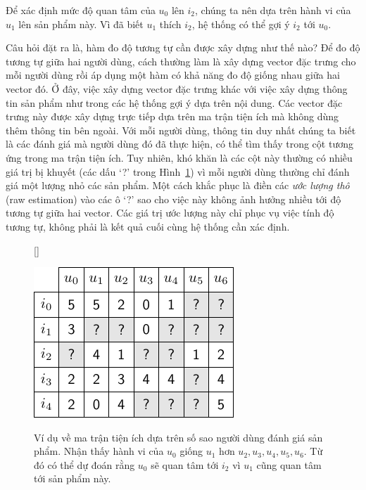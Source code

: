 Để xác định {mức độ quan tâm} của $u_0$ lên $i_2$, chúng
ta nên dựa trên {hành vi} của $u_1$ lên sản phẩm này. Vì đã biết $u_1$ {thích} $i_2$, hệ thống có thể gợi ý $i_2$ tới $u_0$.
 
Câu hỏi đặt ra là, hàm đo độ tương tự cần được xây dựng như thế nào? Để đo độ
tương tự giữa hai người dùng, cách thường làm là xây dựng vector đặc trưng cho
mỗi người dùng rồi áp dụng một hàm có khả năng đo độ giống nhau giữa hai vector
đó. Ở đây, việc xây dựng vector đặc trưng khác với việc xây dựng thông tin sản
phẩm như trong các hệ thống gợi ý dựa trên nội dung. Các vector đặc trưng này
được xây dựng trực tiếp dựa trên ma trận tiện ích mà không dùng thêm thông tin
bên ngoài. Với mỗi người dùng, thông tin duy nhất chúng ta biết là các đánh giá
mà người dùng đó đã thực hiện, có thể tìm thấy trong cột tương ứng trong ma trận
tiện ích. Tuy nhiên, khó khăn là các cột này thường có nhiều giá trị bị khuyết
(các dấu `?' trong Hình~\ref{fig:24_1}) vì mỗi người dùng thường chỉ đánh giá
một lượng nhỏ các sản phẩm. Một cách khắc phục là điền các \textit{ước lượng
thô} (raw estimation) vào các ô `?' sao cho việc này không ảnh hưởng nhiều tới
{độ tương tự} giữa hai vector. Các giá trị ước lượng này chỉ phục vụ việc tính độ
tương tự, không phải là kết quả cuối cùng hệ thống cần xác định.
\begin{figure}[t]
    [\FBwidth]
    {\caption{ 
    Ví dụ về ma trận tiện ích dựa trên số sao người dùng đánh giá
    sản phẩm. Nhận thấy {hành vi} của $u_0$ giống $u_1$ hơn $u_2, u_3, u_4, u_5, u_6$. Từ đó có thể dự đoán rằng $u_0$ sẽ quan tâm tới $i_2$ vì $u_1$ cũng quan tâm tới sản phẩm này.
    }
    \label{fig:24_1}}
    { %
    \includegraphics[width=.45\textwidth]{Chapters/06_RecommendationSystems/24_collaborativefiltering/latex/utility.pdf}
    }
\end{figure}
 
